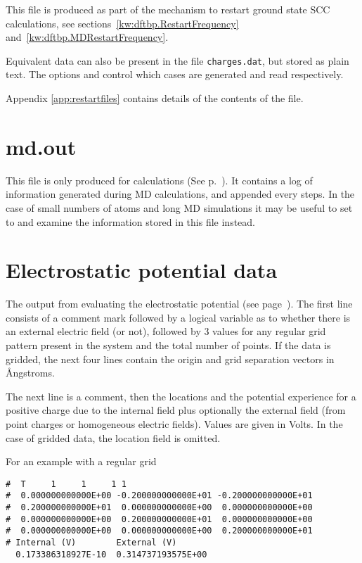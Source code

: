 This file is produced as part of the mechanism to restart ground state SCC
calculations, see sections~\ref{kw:dftbp.RestartFrequency}
and~\ref{kw:dftbp.MDRestartFrequency}.

Equivalent data can also be present in the file \verb|charges.dat|, but stored
as plain text. The options  and 
control which cases are generated and read respectively.

Appendix \ref{app:restartfiles} contains details of the contents of the file.

\section{md.out}
\label{sec:md.out}

This file is only produced for  calculations (See
p.~). It contains a log of information generated during MD
calculations, and appended every  steps. In the case of
small numbers of atoms and long MD simulations it may be useful to set
 to  and examine the information stored in this file
instead.

\section{Electrostatic potential data}
\label{sec:dftbp.espfile}

The output from evaluating the electrostatic potential (see
page~). The first line consists of a comment mark followed
by a logical variable as to whether there is an external electric field (or
not), followed by 3 values for any regular grid pattern present in the system
and the total number of points. If the data is gridded, the next four lines
contain the origin and grid separation vectors in {\AA}ngstroms.

The next line is a comment, then the locations and the potential experience for
a positive charge due to the internal field plus optionally the external field
(from point charges or homogeneous electric fields). Values are given in
Volts. In the case of gridded data, the location field is omitted.

For an example with a regular grid
\begin{verbatim}
#  T     1     1     1 1
#  0.000000000000E+00 -0.200000000000E+01 -0.200000000000E+01
#  0.200000000000E+01  0.000000000000E+00  0.000000000000E+00
#  0.000000000000E+00  0.200000000000E+01  0.000000000000E+00
#  0.000000000000E+00  0.000000000000E+00  0.200000000000E+01
# Internal (V)        External (V)
  0.173386318927E-10  0.314737193575E+00
\end{verbatim}

